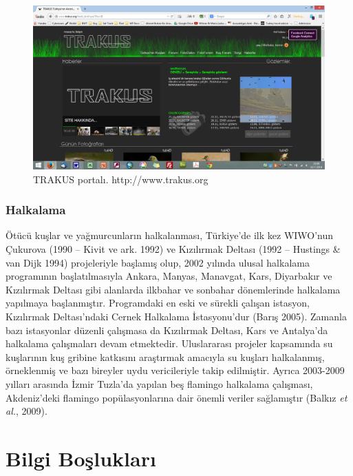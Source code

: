 \documentclass[
  a4paper,
  DIV=11,
  numbers=noendperiod]{scrreprt}
\begin{document}
\begin{figure}[H]

{\centering \includegraphics[width=6.25in,height=\textheight]{images/trakus.png}

}

\caption{TRAKUS portalı. http://www.trakus.org}

\end{figure}%

\subsection*{Halkalama}\label{halkalama}

Ötücü kuşlar ve yağmurcunların halkalanması, Türkiye'de ilk kez WIWO'nun
Çukurova (1990 -- Kivit ve ark. 1992) ve Kızılırmak Deltası (1992 --
Hustings \& van Dijk 1994) projeleriyle başlamış olup, 2002 yılında
ulusal halkalama programının başlatılmasıyla Ankara, Manyas, Manavgat,
Kars, Diyarbakır ve Kızılırmak Deltası gibi alanlarda ilkbahar ve
sonbahar dönemlerinde halkalama yapılmaya başlanmıştır. Programdaki en
eski ve sürekli çalışan istasyon, Kızılırmak Deltası'ndaki Cernek
Halkalama İstasyonu'dur (Barış 2005). Zamanla bazı istasyonlar düzenli
çalışmasa da Kızılırmak Deltası, Kars ve Antalya'da halkalama
çalışmaları devam etmektedir. Uluslararası projeler kapsamında su
kuşlarının kuş gribine katkısını araştırmak amacıyla su kuşları
halkalanmış, örneklenmiş ve bazı bireyler uydu vericileriyle takip
edilmiştir. Ayrıca 2003-2009 yılları arasında İzmir Tuzla'da yapılan beş
flamingo halkalama çalışması, Akdeniz'deki flamingo popülasyonlarına
dair önemli veriler sağlamıştır (Balkız \emph{et al.}, 2009).


\chapter*{Bilgi Boşlukları}\label{bilgi-boux15fluklarux131}
\end{document}
